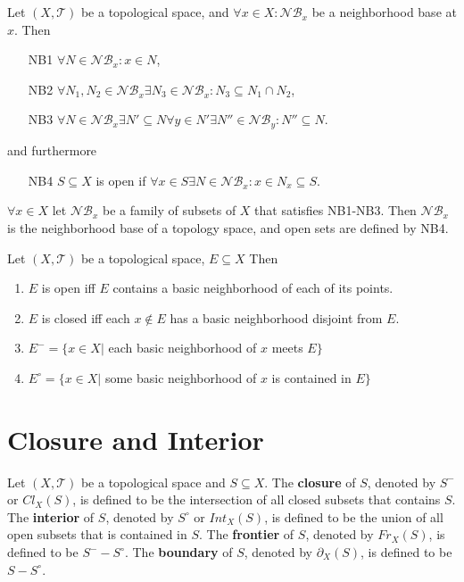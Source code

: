\documentclass[12pt]{book}
\begin{document}
\begin{theorem}
	Let $(X,\mathcal T)$ be a topological space, and $\forall x\in X:\mathcal {NB}_x$ be a neighborhood base at $x$. Then
	\begin{enumerate}
		\item [NB1] $\forall N\in \mathcal {NB}_x:x\in N$,
		\item [NB2] $\forall N_1,N_2\in \mathcal {NB}_x\exists N_3\in \mathcal {NB}_x: N_3\subseteq N_1\cap N_2$,
		\item [NB3] $\forall N\in \mathcal {NB}_x\exists N'\subseteq N\forall y\in N'\exists N''\in \mathcal {NB}_y:N''\subseteq N$.
	\end{enumerate}
	and furthermore
	\begin{enumerate}
		\item[NB4] $S\subseteq X$ is open if $\forall x\in S\exists N\in \mathcal{NB}_x:x\in N_x\subseteq S$.
	\end{enumerate}
	
	$\forall x\in X$ let $\mathcal {NB}_x$ be a family of subsets of $X$ that satisfies NB1-NB3. Then $\mathcal {NB}_x$ is the neighborhood base of a topology space, and open sets are defined by NB4.
\end{theorem}

\begin{theorem}
	Let $(X,\mathcal T)$ be a topological space, $E\subseteq X$ Then
	\begin{enumerate}
		\item $E$ is open iff $E$ contains a basic neighborhood of each of its points.
		\item $E$ is closed iff each $x\not\in E$ has a basic neighborhood disjoint from $E$.
		\item $E^-=\{x\in X|$ each basic neighborhood of $x$ meets $E\}$
		\item $E^\circ=\{x\in X|$ some basic neighborhood of $x$ is contained in $E\}$
	\end{enumerate}
\end{theorem}


\section{Closure and Interior}

\begin{definition}
	Let $(X,\mathcal T)$ be a topological space and $S\subseteq X$. The {\bf closure} of $S$, denoted by $S^-$ or $Cl_X(S)$, is defined to be the intersection of all closed subsets that contains $S$. The {\bf interior} of $S$, denoted by $S^\circ$ or $Int_X(S)$, is defined to be the union of all open subsets that is contained in $S$. The {\bf frontier} of $S$, denoted by $Fr_X(S)$, is defined to be $S^--S^\circ$. The {\bf boundary} of $S$, denoted by $\partial_X(S)$, is defined to be $S-S^\circ$.
\end{definition}
\end{document}
